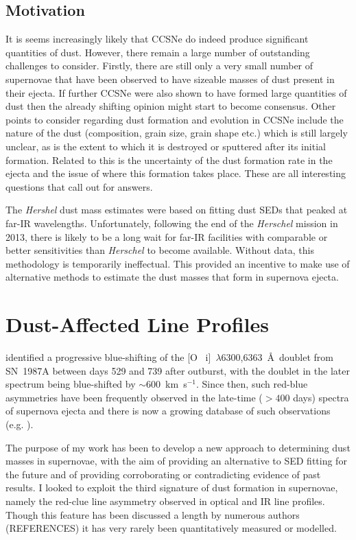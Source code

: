 \subsection{Motivation}
It is seems increasingly likely that CCSNe do indeed produce significant quantities of dust.  However, there remain a large number of outstanding challenges to consider.  Firstly, there are still only a very small number of supernovae that have been observed to have sizeable masses of dust present in their ejecta.  If further CCSNe were also shown to have formed large quantities of dust then  the already shifting opinion might start to become consensus.  Other points to consider regarding dust formation and evolution in CCSNe include the nature of the dust (composition, grain size, grain shape etc.) which is still largely unclear, as is the extent to which it is destroyed or sputtered after its initial formation.  Related to this is the uncertainty of the dust formation rate in the ejecta and the issue of where this formation takes place.  These are all interesting questions that call out for answers.  

The {\em Hershel} dust mass estimates were based on fitting dust SEDs that peaked at far-IR wavelengths. Unfortunately, following the end of the {\em Herschel} mission in 2013, there is likely to be a long wait for far-IR facilities with comparable or better sensitivities than {\em Herschel} to become available.  Without data, this methodology is temporarily ineffectual.  This provided an incentive to make use of alternative methods to estimate the dust masses that form in supernova ejecta.

\section{Dust-Affected Line Profiles}


 \citet{Lucy1989} identified a progressive blue-shifting of the [O~{\sc 
i}]~$\lambda$6300,6363~\AA\ doublet from SN~1987A between days 529 and 739 
after outburst, with the doublet in the later spectrum being blue-shifted 
by $\sim 600 $~km~s$^{-1}$. Since then, such red-blue asymmetries have 
been frequently observed in the late-time ($ > 400$ days) spectra of 
supernova ejecta and there is now a growing database of such observations (e.g.
\citet{Lucy1989,Fabbri2011,Mauerhan2012,Milisavljevic2012}).


The purpose of my work has been to develop a new approach to determining dust masses in supernovae, with the aim of providing an alternative to SED fitting for the future and of providing corroborating or contradicting evidence of past results.  I looked to exploit the third signature of dust formation in supernovae, namely the red-clue line asymmetry observed in optical and IR line profiles.  Though this feature has been discussed a length by numerous authors (REFERENCES) it has very rarely been quantitatively measured or modelled.

